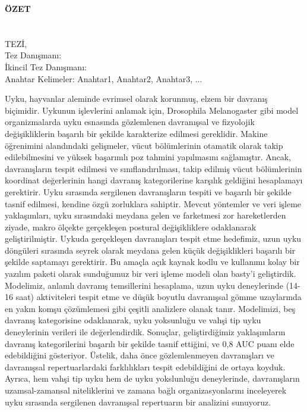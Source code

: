 \clearpage\pagebreak
\begin{center}
	\MakeUppercase{\textbf{Özet}} \\ [3\baselineskip]
	\MakeUppercase{\thesistitletr} \\ [3\baselineskip]
	\MakeUppercase{\student} \\[\baselineskip]
	\MakeUppercase{\majortr \degreetr Tez\.{ı}, \monthtr~\year} \\[\baselineskip]
	Tez Danışmanı: \advisortr \\
	İkincil Tez Danışmanı: \coadvisortr \\
	[2\baselineskip]
	Anahtar Kelimeler: Anahtar1, Anahtar2, Anahtar3, ... \\[2\baselineskip]
\end{center}

\onehalfspacing

Uyku, hayvanlar aleminde evrimsel olarak korunmuş, elzem bir davranış biçimidir.
Uykunun işlevlerini anlamak için, Drosophila Melanogaster gibi model organizmalarda uyku esnasında gözlemlenen davranışsal ve fizyolojik değişikliklerin başarılı bir şekilde karakterize edilmesi gereklidir.
Makine öğrenimini alandındaki gelişmeler, vücut bölümlerinin otamatik olarak takip edilebilmesini ve yüksek başarımlı poz tahmini yapılmasını sağlamıştır.
Ancak, davranışların tespit edilmesi ve sınıflandırılması, takip edilmiş vücut bölümlerinin koordinat değerlerinin hangi davranış kategorilerine karşılık geldiğini hesaplamayı gerektirir.
Uyku sırasında sergilenen davranışların tespiti ve başarılı bir şekilde tasnif edilmesi, kendine özgü zorluklara sahiptir.
Mevcut yöntemler ve veri işleme yaklaşımları, uyku sırasındaki meydana gelen ve farketmesi zor hareketlerden ziyade, makro ölçekte gerçekleşen postural değişikliklere odaklanarak geliştirilmiştir.
Uykuda gerçekleşen davranışları tespit etme hedefimiz, uzun uyku döngüleri sırasında seyrek olarak meydana gelen küçük değişiklikleri başarılı bir şekilde saptamayı gerektirir.
Bu amaçla açık kaynak kodlu ve kullanımı kolay bir yazılım paketi olarak sunduğumuz bir veri işleme modeli olan basty’i geliştirdik.
Modelimiz, anlamlı davranış temsillerini hesaplama, uzun uyku deneylerinde (14-16 saat) aktiviteleri tespit etme ve düşük boyutlu davranışsal gömme uzaylarında en yakın komşu çözümlemesi gibi çeşitli analizlere olanak tanır.
Modelimizi, beş davranış kategorisine odaklanarak, uyku yoksunluğu ve vahşi tip uyku deneylerinin verileri ile değerlendirdik.
Sonuçlar, geliştirdiğimiz yaklaşımların davranış kategorilerini başarılı bir şekilde tasnif ettiğini, ve 0,8 AUC puanı elde edebildiğini gösteriyor.
Üstelik, daha önce gözlemlenmeyen davranışları ve davranışsal repertuarlardaki farklılıkları tespit edebildiğini de ortaya koyduk.
Ayrıca, hem vahşi tip uyku hem de uyku yokslunluğu deneylerinde, davranışların uzamsal-zamansal niteliklerini ve zamana bağlı organizasyonlarını inceleyerek uyku sırasında sergilenen davranışsal repertuarın bir analizini sunuyoruz.

